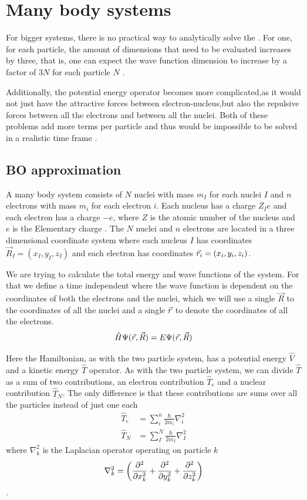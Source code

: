 \documentclass[../master_thesis.tex]{subfiles}
\begin{document}
\section{Many body systems}

For bigger systems, there is no practical way to analytically solve the
\SE \cite{Jensen:2017}. For one, for each particle, the amount of dimensions that need to be
evaluated increases by three, that is, one can expect the wave function
dimension to increase by a factor of $3N$ for each particle $N$
\cite{Cramer:2004}.

Additionally, the potential energy operator becomes more complicated,as it
would not just have the attractive forces between electron-nucleus,but also the
repulsive forces between all the electrons and between all the nuclei. Both of
these problems add more terms per particle and thus would be impossible to be
solved in a realistic time frame \cite{Jensen:2017}.

\subsection{\ac{BO} approximation} \label{BO}
A many body system consists of $N$ nuclei with mass $m_I$ for each nuclei $I$
and $n$ electrons with mass $m_i$ for each electron $i$. Each nucleus has a
charge $Z_Ie$ and each electron has a charge $-e$, where $Z$ is the atomic
number of the nucleus  and $e$ is the Elementary charge \cite{Atkins:2014}. The $N$ nuclei and $n$
electrons are located in a three dimensional coordinate system where each nucleus $I$ has
coordinates $\vec{R}_I = (x_I, y_I, z_I)$ and each electron has coordinates
$\vec{r}_i = (x_i, y_i, z_i)$.

We are trying to calculate the total energy and wave functions of the system. For
that we define a time independent \SE where the wave function is dependent on
the coordinates of both the electrons and the nuclei, which we will use a single $\vec{R}$
to the coordinates of all the nuclei and a single $\vec{r}$ to denote the coordinates
of all the electrons.
\begin{equation}\label{eq:totalheliumSE}
  \hat{H}\Psi(\vec{r}, \vec{R}) = E \Psi(\vec{r}, \vec{R})
\end{equation}

Here the Hamiltonian, as with the two particle system, has a potential energy $\hat{V}$ and a
kinetic energy $\hat{T}$ operator. As with the two particle system, we can divide $\hat{T}$ as
a sum of two contributions, an electron contribution $\hat{T}_e$ and a nuclear contribution
$\hat{T}_N$. The only difference is that these contributions are sums over all
the particles  instead of just one each\cite{Cramer:2004}
\begin{align}
  \hat{T}_e &= \sum_i^n \frac{\hbar}{2m_i}\nabla^2_i\\
  \hat{T}_N &= \sum_I^N \frac{\hbar}{2m_I}\nabla^2_I
\end{align}
where $\nabla^2_k$ is the Laplacian operator operating on particle $k$
\begin{equation}
  \nabla^2_k = \left( \frac{\partial^2}{\partial x_k^2} + \frac{\partial^2}{\partial y_k^2} + \frac{\partial^2}{\partial z_k^2} \right)
\end{equation}.
\end{document}
